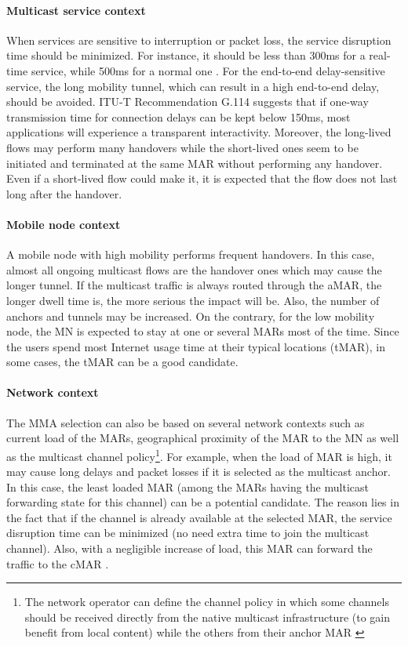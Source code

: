 \paragraph{Multicast service context}
When services are sensitive to interruption or packet loss, the service disruption time should be minimized. For instance, it should be less than 300ms for a real-time service, while 500ms for a normal one \cite{interruption_requirements}. For the end-to-end delay-sensitive service, the long mobility tunnel, which can result in a high end-to-end delay, should be avoided. ITU-T Recommendation G.114 \cite{itu-t} suggests that if one-way transmission time for connection delays can be kept below 150ms, most applications will experience a transparent interactivity. Moreover, the long-lived flows may perform many handovers while the short-lived ones seem to be initiated and terminated at the same MAR without performing any handover. Even if a short-lived flow could make it, it is expected that the flow does not last long after the handover. 

\paragraph{Mobile node context}
A mobile node with high mobility performs frequent handovers. In this case, almost all ongoing multicast flows are the handover ones which may cause the longer tunnel. If the multicast traffic is always routed through the aMAR, the longer dwell time is, the more serious the impact will be. Also, the number of anchors and tunnels may be increased. On the contrary, for the low mobility node, the MN is expected to stay at one or several MARs most of the time. Since the users spend most Internet usage time at their typical locations (tMAR), in some cases, the tMAR can be a good candidate. 

\paragraph{Network context}
The MMA selection can also be based on several network contexts such as current load of the MARs, geographical proximity of the MAR to the MN as well as the multicast channel policy\footnote{The network operator can define the channel policy in which some channels should be received directly from the native multicast infrastructure (to gain benefit from local content) while the others from their anchor MAR \cite{Thinh_VTC}}. For example, when the load of MAR is high, it may cause long delays and packet losses if it is selected as the multicast anchor. In this case, the least loaded MAR (among the MARs having the multicast forwarding state for this channel) can be a potential candidate. The reason lies in the fact that if the channel is already available at the selected MAR, the service disruption time can be minimized (no need extra time to join the multicast channel). Also, with a negligible increase of load, this MAR can forward the traffic to the cMAR \cite{developing_ip_multicast}.

